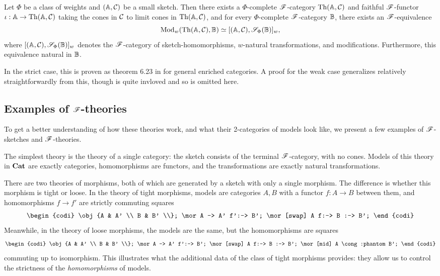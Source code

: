 \documentclass[../thesis.tex]{subfiles}
\begin{document}
\begin{theorem}
  Let $\Phi$ be a class of weights and $({\mathbb{A}},{\mathcal{C}})$ be a small sketch. Then there exists a $\Phi$-complete
  ${\mathscr{F}}$-category ${\mathrm{Th}}({\mathbb{A}},{\mathcal{C}})$ and faithful ${\mathscr{F}}$-functor $\iota : {\mathbb{A}} \to {\mathrm{Th}}({\mathbb{A}},{\mathcal{C}})$ taking the cones
  in ${\mathcal{C}}$ to limit cones in ${\mathrm{Th}}({\mathbb{A}},{\mathcal{C}})$, and for every $\Phi$-complete ${\mathscr{F}}$-category ${\mathbb{B}}$, there exists
  an ${\mathscr{F}}$-equivalence
  \[{\mathrm{Mod}}_w({\mathrm{Th}}({\mathbb{A}},{\mathcal{C}}),{\mathbb{B}}) \simeq [({\mathbb{A}},{\mathcal{C}}), {\mathscr{S}}_\Phi({\mathbb{B}})]_w,\]
  where $[({\mathbb{A}},{\mathcal{C}}), {\mathscr{S}}_\Phi({\mathbb{B}})]_w$ denotes the ${\mathscr{F}}$-category of sketch-homomorphisms, $w$-natural
  transformations, and modifications. Furthermore, this equivalence natural in ${\mathbb{B}}$.
\end{theorem}
\begin{remark}
  In the strict case, this is proven as theorem 6.23 in \cite{kelly1982a} for general enriched categories.
  A proof for the weak case generalizes relatively straightforwardly from this, though is quite invloved
  and so is omitted here.
\end{remark}

\subsection{Examples of \texorpdfstring{${\mathscr{F}}$}{F}-theories}
To get a better understanding of how these theories work, and what their 2-categories of models look like,
we present a few examples of ${\mathscr{F}}$-sketches and ${\mathscr{F}}$-theories.

\begin{example}
  The simplest theory is the theory of a single category: the sketch consists of the terminal
  ${\mathscr{F}}$-category, with no cones. Models of this theory in ${\mathbf{Cat}}$ are exactly categories,
  homomorphisms are functors, and the transformations are exactly natural transformations.
\end{example}

\begin{example}
  There are two theories of morphisms, both of which are generated by a sketch with only a single morphism.
  The difference is whether this morphism is tight or loose. In the theory of tight morphisms, models are
  categories $A,B$ with a functor $f : A \to B$ between them, and homomorphisms $f \to f'$ are strictly
  commuting squares
  \[\begin{codi}
    \obj {A & A' \\ B & B' \\};
    \mor A -> A' f':-> B';
    \mor[swap] A f:-> B :-> B';
  \end{codi}\]
  Meanwhile, in the theory of loose morphisms, the models are the same, but the homomorphisms are squares 
  \[\begin{codi}
    \obj {A & A' \\ B & B' \\};
    \mor A -> A' f':-> B';
    \mor[swap] A f:-> B :-> B';
    \mor[mid] A \cong:phantom B';
  \end{codi}\]
  commuting up to isomorphism. This illustrates what the additional data of the class of tight morphisms
  provides: they allow us to control the strictness of the \emph{homomorphisms} of models.
\end{example}
\end{document}
